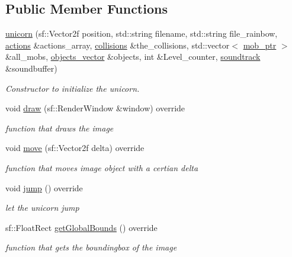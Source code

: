 \subsection*{Public Member Functions}
\begin{DoxyCompactItemize}
\item 
\hyperlink{classunicorn_a89d3654cfd56c282b5061082e6864245}{unicorn} (sf\+::\+Vector2f position, std\+::string filename, std\+::string file\+\_\+rainbow, \hyperlink{typedefs_8hpp_a38f93e4749e0d65d51360c429766d212}{actions} \&actions\+\_\+array, \hyperlink{typedefs_8hpp_a7e1a7f34f6d09dabb4cdafd6e4118603}{collisions} \&the\+\_\+collisions, std\+::vector$<$ \hyperlink{typedefs_8hpp_a09ee7f853fc9bc830a9445a06fd53d4b}{mob\+\_\+ptr} $>$ \&all\+\_\+mobs, \hyperlink{typedefs_8hpp_a6c0fdb1dfd0c34dbbdbb5dcd3c608b07}{objects\+\_\+vector} \&objects, int \&Level\+\_\+counter, \hyperlink{classsoundtrack}{soundtrack} \&soundbuffer)
\begin{DoxyCompactList}\small\item\em Constructor to initialize the unicorn. \end{DoxyCompactList}\item 
void \hyperlink{classunicorn_a570c34d5669a8d2a61bdc1481e6f9dee}{draw} (sf\+::\+Render\+Window \&window) override
\begin{DoxyCompactList}\small\item\em function that draws the image \end{DoxyCompactList}\item 
void \hyperlink{classunicorn_a162f200a68342f7bc0baaf17c8cf3f9f}{move} (sf\+::\+Vector2f delta) override
\begin{DoxyCompactList}\small\item\em function that moves image object with a certian delta \end{DoxyCompactList}\item 
void \hyperlink{classunicorn_a07d5ca4e66632c0e871221a27146805a}{jump} () override
\begin{DoxyCompactList}\small\item\em let the unicorn jump \end{DoxyCompactList}\item 
sf\+::\+Float\+Rect \hyperlink{classunicorn_a1bac09fc59b04f14f5a093bc4daa04da}{get\+Global\+Bounds} () override
\begin{DoxyCompactList}\small\item\em function that gets the boundingbox of the image \end{DoxyCompactList}\item 

\end{DoxyCompactItemize}
